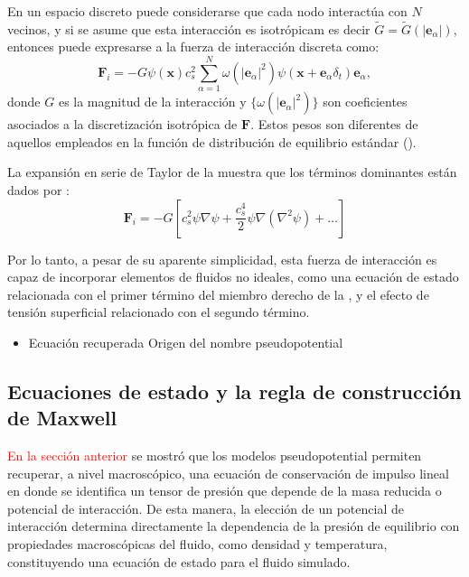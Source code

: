 En un espacio discreto puede considerarse que cada nodo interact\'ua con $N$ vecinos, y si se asume que esta interacci\'on es isotr\'opicam es decir $\tilde{G} = \tilde{G}(|\bm{e}_{\alpha}|)$, entonces puede expresarse a la fuerza de interacci\'on discreta como:
\begin{equation}
	\bm{F}_i = -G\psi(\bm{x})c_s^2 \sum_{\alpha=1}^N \omega(|\bm{e}_{\alpha}|^2)\psi(\bm{x}+\bm{e}_{\alpha}\delta_t)\bm{e}_{\alpha},
	\label{eq:f_int}
\end{equation}
donde $G$  es la magnitud de la interacci\'on y $\{\omega(|\bm{e}_{\alpha}|^2)\}$ son coeficientes asociados a la discretizaci\'on isotr\'opica de $\bm{F}$. Estos pesos son diferentes de 	aquellos empleados en la funci\'on de distribuci\'on de equilibrio est\'andar ().

La expansi\'on en serie de Taylor de la  muestra que los t\'erminos dominantes est\'an dados por \cite{shan_pressure_2008}:
\begin{equation}
	\bm{F}_i=-G\left[ c_s^2 \psi \nabla \psi + \dfrac{c_s^4}{2} \psi \nabla (\nabla^2 \psi)  + \ldots \right]
	\label{eq:f_int_taylor}
\end{equation}

Por lo tanto, a pesar de su aparente simplicidad, esta fuerza de interacci\'on es capaz de incorporar elementos de fluidos no ideales, como una ecuaci\'on de estado relacionada con el primer t\'ermino del miembro derecho de la , y el efecto de tensi\'on superficial relacionado con el segundo t\'ermino.

\begin{itemize}
	\item Ecuaci\'on recuperada
	Origen del nombre pseudopotential
\end{itemize}


\subsection{Ecuaciones de estado y la regla de construcci\'on de Maxwell}
\label{sec:EOS}

\textcolor{red}{En la secci\'on anterior} se mostr\'o que los modelos pseudopotential permiten recuperar, a nivel macrosc\'opico, una ecuaci\'on de conservaci\'on de impulso lineal en donde se identifica un tensor de presi\'on que depende de la masa reducida o potencial de interacci\'on. De esta manera, la elecci\'on de un potencial de interacci\'on determina directamente la dependencia de la presi\'on de equilibrio con propiedades macrosc\'opicas del fluido, como densidad y temperatura, constituyendo una ecuaci\'on de estado para el fluido simulado. 

